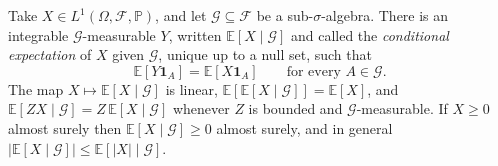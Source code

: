 \begin{theorem}\label{thm:condexp}
Take $X\in L^1(\Omega,\mathcal F,\mathbb P)$, and let $\mathcal G\subseteq\mathcal F$ be a sub-$\sigma$-algebra. There is an integrable $\mathcal G$-measurable $Y$, written $\mathbb E[X\mid\mathcal G]$ and called the \emph{conditional expectation} of $X$ given $\mathcal G$, unique up to a null set, such that
\[
\mathbb E[Y\mathbf 1_A]=\mathbb E[X\mathbf 1_A]\qquad\text{for every }A\in\mathcal G.
\]
The map $X\mapsto\mathbb E[X\mid\mathcal G]$ is linear, $\mathbb E[\mathbb E[X\mid\mathcal G]]=\mathbb E[X]$, and $\mathbb E[ZX\mid\mathcal G]=Z\,\mathbb E[X\mid\mathcal G]$ whenever $Z$ is bounded and $\mathcal G$-measurable. If $X\ge0$ almost surely then $\mathbb E[X\mid\mathcal G]\ge0$ almost surely, and in general $|\mathbb E[X\mid\mathcal G]|\le\mathbb E[|X|\mid\mathcal G]$.
\end{theorem}
